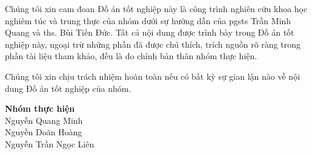 Chúng tôi xin cam đoan Đồ án tốt nghiệp này là công trình nghiên cứu khoa học nghiêm túc và trung thực của nhóm dưới sự hướng dẫn của \acrshort{pgsts} Trần Minh Quang và \acrshort{ths}. Bùi Tiến Đức. Tất cả nội dung được trình bày trong Đồ án tốt nghiệp này, ngoại trừ những phần đã được chú thích, trích nguồn rõ ràng trong phần tài liệu tham khảo, đều là do chính bản thân nhóm thực hiện.

\indent Chúng tôi xin chịu trách nhiệm hoàn toàn nếu có bất kỳ sự gian lận nào về nội dung Đồ án tốt nghiệp của nhóm.

\begin{flushright}
    \textbf{Nhóm thực hiện}\\
    Nguyễn Quang Minh \\
    Nguyễn Doãn Hoàng \\
    Nguyễn Trần Ngọc Liên \\
\end{flushright}